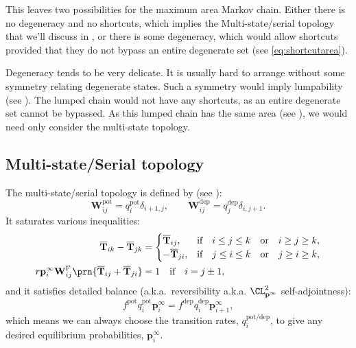 \documentclass{article} %
\newcommand{\pr}{\mathbf{p}}
\newcommand{\eq}{\pr^\infty}
\newcommand{\fpt}{\mathbf{T}}
\newcommand{\fptb}{\overline{\fpt}}
\newcommand{\W}{\mathbf{W}}
\newcommand{\frg}{\W^{\mathrm{F}}}
\newcommand{\pot}{^{\text{pot}}}
\newcommand{\dep}{^{\text{dep}}}
\newcommand{\potdep}{^{\text{pot/dep}}}
\begin{document}
This leaves two possibilities for the maximum area Markov chain.
Either there is no degeneracy and no shortcuts, which implies the Multi-state/serial topology that we'll discuss in , or there is some degeneracy, which would allow shortcuts provided that they do not bypass an entire degenerate set (see \eqref{eq:shortcutarea}).

Degeneracy tends to be very delicate. It is usually hard to arrange without some symmetry relating degenerate states. Such a symmetry would imply lumpability (see ). The lumped chain would not have any shortcuts, as an entire degenerate set cannot be bypassed. As this lumped chain has the same area (see ), we would need only consider the multi-state topology.


\subsection{Multi-state/Serial topology}\label{sec:multistate}

The multi-state/serial topology is defined by (see \cite{amit1994learning,Fusi2007multistate,Leibold2008serial}):
%
\begin{equation}\label{eq:multistatedef}
  \W\pot _{ij} = q\pot _i \delta_{i+1,j},
  \qquad
  \W\dep _{ij} = q\dep _j \delta_{i,j+1}.
\end{equation}
%
It saturates various inequalities:
%
\begin{equation}\label{eq:multistateineq}
  \begin{aligned}
    \fptb_{ik} - \fptb_{jk} &=
      \begin{cases}
        \fptb_{ij},  &\text{if}\quad i \leq j \leq k \quad\text{or}\quad i \geq j \geq k,\\
        -\fptb_{ji}, &\text{if}\quad j \leq i \leq k \quad\text{or}\quad j \geq i \geq k,\\
      \end{cases} \\
    r\eq_i \frg_{ij} \prn{\fptb_{ij}+\fptb_{ji}} &= 1 \quad\text{if}\quad i=j\pm1,
  \end{aligned}
\end{equation}
%
and it satisfies detailed balance (a.k.a.\ reversibility a.k.a. $\CL^2_{\eq}$ self-adjointness):
%
\begin{equation}\label{eq:multistateprob}
  f\pot  q\pot _i \eq_i = f\dep  q\dep _i \eq_{i+1},
\end{equation}
%
which means we can always choose the transition rates, $q\potdep _i$, to give any desired equilibrium probabilities, $\eq_i$.
\end{document}
